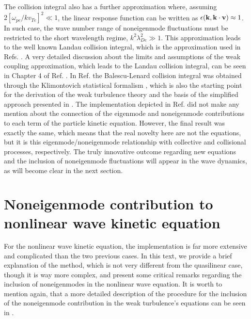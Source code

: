 \documentclass[12pt,a4paper,ruledheader]{report}
\begin{document}
The collision integral also has a further approximation where,
assuming $2[\omega_{pe}/kv_{Te}]^2\ll 1$, the linear response
function can be written as $\epsilon({\bf k},{\bf k \cdot v})
\approx 1$. In such case, the wave number range of noneigenmode
fluctuations must be restricted to the short wavelength regime,
$k^2\lambda_{De}^2\gg 1$. This approximation leads to the well
known Landau collision integral, which is the approximation used
in Refs. \cite{Tigik2016a,Tigik2017a}. A very detailed discussion
about the limits and assumptions of the weak coupling approximation,
which leads to the Landau collision integral,
 can be seen in Chapter
4 of Ref. \cite{Tigik2015}.
In Ref. \cite{Tigik2015} the Balescu-Lenard collision integral was
obtained through the Klimontovich statistical formalism
\cite{klimo,klimon}, which is also the starting point for
the derivation of the weak turbulence theory \cite{YZKS16} and the
basis of the simplified approach presented in .
The implementation depicted in Ref. \cite{Tigik2015} did not make
any mention about the connection of the eigenmode and noneigenmode
contributions to each term of the particle kinetic equation. However,
the final result was exactly the same, which means that
the real novelty
here are not the equations, but it is this eigenmode/noneigenmode
relationship with collective and collisional processes, respectively.
The truly innovative outcome regarding new equations and the inclusion
of noneigenmode fluctuations will appear in the wave dynamics, as will
become clear in the next section.


\section{Noneigenmode contribution to nonlinear wave
  kinetic equation}
\label{sec:non-non}
For the nonlinear wave kinetic equation, the implementation is far more
extensive and complicated than the two previous cases. In this text, we
provide a brief explanation of the method, which is not very different
from the quasilinear case, though it is way more complex, and present some
critical remarks regarding the inclusion of noneigenmodes in the nonlinear
wave equation. It is worth to mention again, that a more detailed description
of the procedure
for the inclusion of the noneigenmode contribution in the weak turbulence's
equations can be seen in \cite{YZKS16}.
\end{document}

